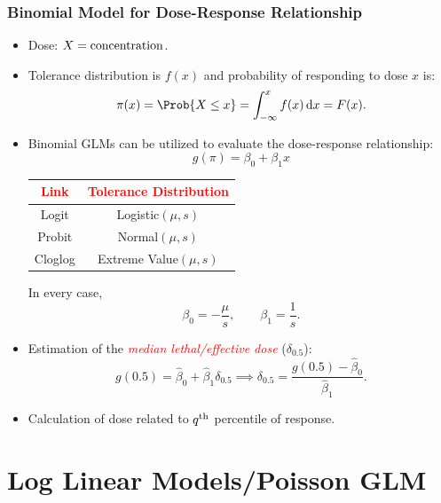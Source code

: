 \documentclass[oneside]{book}\usepackage[]{graphicx}\usepackage[svgnames]{xcolor}
\let\log\relax%
\begin{document}
\subsection*{Binomial Model for Dose-Response Relationship}
\begin{itemize}
      \item Dose: $ X=\log{\text{concentration}} $.
      \item Tolerance distribution is $ f(x) $ and probability of responding to dose $ x $ is:
            \[ \pi(x)=\Prob{X\le x}=\int_{-\infty}^{x}f(x)\odif{x}=F(x). \]
      \item Binomial GLMs can be utilized to evaluate the dose-response relationship:
            \[ g(\pi)=\beta_0+\beta_1x \]
            \begin{table}[!htbp]
                  \centering
                  \begin{tabular}{cc}
                        \toprule
                        \textcolor{Red}{Link} & \textcolor{Red}{Tolerance Distribution} \\
                        \midrule
                        Logit                 & Logistic$(\mu,s)$                       \\
                        Probit                & Normal$(\mu,s)$                         \\
                        Cloglog               & Extreme Value$(\mu,s)$                  \\
                        \bottomrule
                  \end{tabular}
            \end{table}
            In every case,
            \[ \beta_0=-\frac{\mu}{s},\qquad \beta_1=\frac{1}{s}. \]
      \item Estimation of the \textcolor{Red}{\emph{median lethal/effective dose}} ($ \delta_{0.5} $):
            \[ g(0.5)=\hat{\beta}_0+\hat{\beta}_1\delta_{0.5}\implies \delta_{0.5}=\frac{g(0.5)-\hat{\beta}_0}{\hat{\beta}_1}.  \]
      \item Calculation of dose related to $ q\textsuperscript{th} $ percentile of response.
\end{itemize}

\chapter{Log Linear Models/Poisson GLM}
\end{document}

